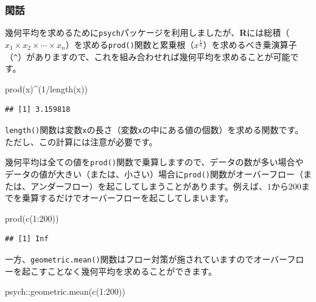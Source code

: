 \documentclass[
  12pt,
]{book}
\newenvironment{Shaded}{\begin{snugshade}}{\end{snugshade}}
\newcommand{\DecValTok}[1]{\textcolor[rgb]{0.00,0.00,0.81}{#1}}
\newcommand{\FunctionTok}[1]{\textcolor[rgb]{0.00,0.00,0.00}{#1}}
\newcommand{\NormalTok}[1]{#1}
\newcommand{\SpecialCharTok}[1]{\textcolor[rgb]{0.00,0.00,0.00}{#1}}
\begin{document}
\hypertarget{ux9591ux8a71}{%
\subsubsection*{閑話}\label{ux9591ux8a71}}

幾何平均を求めるために\texttt{psych}パッケージを利用しましたが、\textbf{R}には総積（\(x_1 \times x_2 \times \cdots \times x_n\)）を求める\texttt{prod()}関数と累乗根（\(x^{\frac{1}{n}}\)）を求めるべき乗演算子（\texttt{\^{}}）がありますので、これを組み合わせれば幾何平均を求めることが可能です。

\begin{Shaded}
\begin{Highlighting}[]
\FunctionTok{prod}\NormalTok{(x)}\SpecialCharTok{\^{}}\NormalTok{(}\DecValTok{1}\SpecialCharTok{/}\FunctionTok{length}\NormalTok{(x))}
\end{Highlighting}
\end{Shaded}

\begin{verbatim}
## [1] 3.159818
\end{verbatim}

\texttt{length()}関数は変数\texttt{x}の長さ（変数\texttt{x}の中にある値の個数）を求める関数です。ただし、この計算には注意が必要です。

幾何平均は全ての値を\texttt{prod()}関数で乗算しますので、データの数が多い場合やデータの値が大きい（または、小さい）場合に\texttt{prod()}関数がオーバーフロー（または、アンダーフロー）を起こしてしまうことがあります。例えば、\(1\)から\(200\)までを乗算するだけでオーバーフローを起こしてしまいます。

\begin{Shaded}
\begin{Highlighting}[]
\FunctionTok{prod}\NormalTok{(}\FunctionTok{c}\NormalTok{(}\DecValTok{1}\SpecialCharTok{:}\DecValTok{200}\NormalTok{))}
\end{Highlighting}
\end{Shaded}

\begin{verbatim}
## [1] Inf
\end{verbatim}

一方、\texttt{geometric.mean()}関数はフロー対策が施されていますのでオーバーフローを起こすことなく幾何平均を求めることができます。

\begin{Shaded}
\begin{Highlighting}[]
\NormalTok{psych}\SpecialCharTok{::}\FunctionTok{geometric.mean}\NormalTok{(}\FunctionTok{c}\NormalTok{(}\DecValTok{1}\SpecialCharTok{:}\DecValTok{200}\NormalTok{))}
\end{Highlighting}
\end{Shaded}
\end{document}
